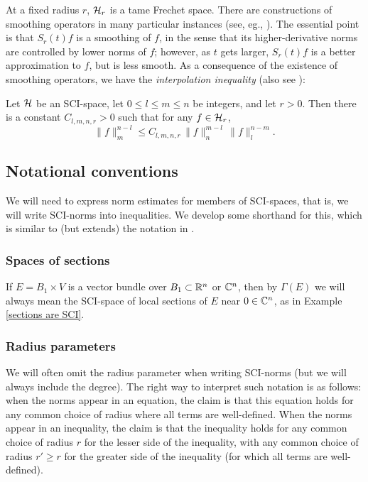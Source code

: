 \documentclass{article}
\begin{document}
\begin{rem}
At a fixed radius $r$, $\mathcal H_r$ is a tame Frechet space.  There are constructions of smoothing operators in many particular instances (see, eg., \cite{Hamilton}).  The essential point is that $S_r(t)f$ is a smoothing of $f$, in the sense that its higher-derivative norms are controlled by lower norms of $f$; however, as $t$ gets larger, $S_r(t)f$ is a better approximation to $f$, but is less smooth.  As a consequence of the existence of smoothing operators, we have the \emph{interpolation inequality} (also see \cite{Hamilton}):
\end{rem}
\begin{prop}\label{interpolation inequality}
Let $\mathcal{H}$ be an SCI-space, let $0\leq l \leq m \leq n$ be integers, and let $r>0$.  Then there is a constant $C_{l,m,n,r}>0$ such that for any $f \in \mathcal{H}_r$,
$$\|f\|_m^{n-l} \leq C_{l,m,n,r}\, \|f\|_n^{m-l}\, \|f\|_l^{n-m}.$$
\end{prop}

\subsection{Notational conventions}

We will need to express norm estimates for members of SCI-spaces, that is, we will write SCI-norms into inequalities.  We develop some shorthand for this, which is similar to (but extends) the notation in \cite{MirandaMonnierZung}.

\subsubsection*{Spaces of sections}
If $E = B_1 \times V$ is a vector bundle over $B_1 \subset \mathbb R^n$ or $\mathbb C^n$, then by $\Gamma(E)$ we will always mean the SCI-space of local sections of $E$ near $0 \in \mathbb C^n$, as in Example \ref{sections are SCI}.
\subsubsection*{Radius parameters}
We will often omit the radius parameter when writing SCI-norms (but we will always include the degree).  The right way to interpret such notation is as follows: when the norms appear in an equation, the claim is that this equation holds for any common choice of radius where all terms are well-defined.  When the norms appear in an inequality, the claim is that the inequality holds for any common choice of radius $r$ for the lesser side of the inequality, with any common choice of radius $r' \geq r$ for the greater side of the inequality (for which all terms are well-defined).
\end{document}
